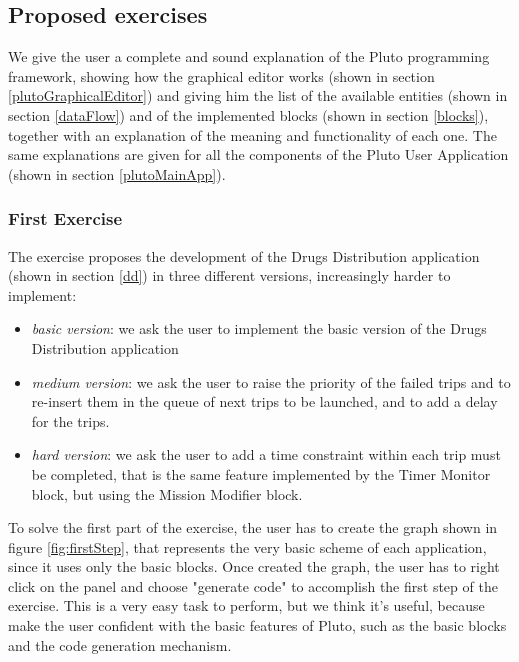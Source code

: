 \subsection{Proposed exercises}
\label{exercise}

We give the user a complete and sound explanation of the Pluto programming framework, showing how the graphical editor works (shown in section \ref{plutoGraphicalEditor}) and giving him the list of the available entities (shown in section \ref{dataFlow}) and of the implemented blocks (shown in section \ref{blocks}), together with an explanation of the meaning and functionality of each one.
The same explanations are given for all the components of the Pluto User Application (shown in section \ref{plutoMainApp}).

\subsubsection{First Exercise}

The exercise proposes the development of the Drugs Distribution application (shown in section \ref{dd}) in three different versions, increasingly harder to implement:

\begin{itemize}
\itemsep2pt
\item{
\textit{basic version}: we ask the user to implement the basic version of the Drugs Distribution application
}
\item{
\textit{medium version}: we ask the user to raise the priority of the failed trips and to re-insert them in the queue of next trips to be launched, and to add a delay for the trips.
}
\item{
\textit{hard version}: we ask the user to add a time constraint within each trip must be completed, that is the same feature implemented by the Timer Monitor block, but using the Mission Modifier block.
}
\end{itemize}

To solve the first part of the exercise, the user has to create the graph shown in figure \ref{fig:firstStep}, that represents the very basic scheme of each application, since it uses only the basic blocks.
Once created the graph, the user has to right click on the panel and choose "generate code" to accomplish the first step of the exercise.
This is a very easy task to perform, but we think it's useful, because make the user confident with the basic features of Pluto, such as the basic blocks and the code generation mechanism.



